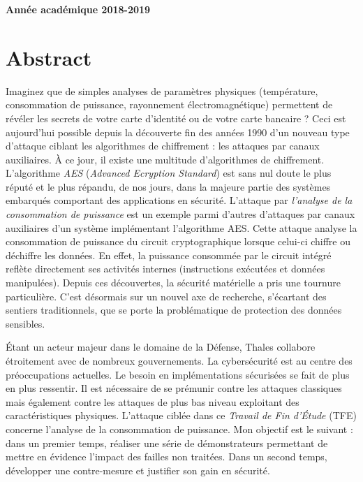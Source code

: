 \documentclass[oneside]{book}
\begin{document}
\vfill 
\centerline{\textbf{Année académique 2018-2019}}

\newpage
\strut
\thispagestyle{empty}
\newpage
\fancyfoot[C]{\thepage}

{} %
\null\vfil
\section*{\centering Abstract}

Imaginez que de simples analyses de paramètres physiques (température, consommation de puissance, rayonnement électromagnétique) permettent de révéler les secrets de votre carte d'identité ou de votre carte bancaire ?  
Ceci est aujourd'hui possible depuis la découverte fin des années 1990 d'un nouveau type d'attaque ciblant les algorithmes de chiffrement : les attaques par canaux auxiliaires. À ce jour, il existe une multitude d’algorithmes de chiffrement. L’algorithme \textit{AES} (\textit{Advanced Ecryption Standard}) est sans nul doute le plus réputé et le plus répandu, de nos jours, dans la majeure partie des systèmes embarqués comportant des applications en sécurité. L'attaque par \textit{l'analyse de la consommation de puissance} est un exemple parmi d'autres d'attaques par canaux auxiliaires d'un système implémentant l'algorithme AES. Cette attaque analyse la consommation de puissance du circuit cryptographique lorsque celui-ci chiffre ou déchiffre les données. En effet, la puissance consommée par le circuit intégré reflète directement ses activités internes (instructions exécutées et données manipulées). Depuis ces découvertes, la sécurité matérielle a pris une tournure particulière. C’est désormais sur un nouvel axe de recherche, s’écartant des sentiers traditionnels, que se porte la problématique de protection des données sensibles.

Étant un acteur majeur dans le domaine de la Défense, Thales collabore étroitement avec de nombreux gouvernements. La cybersécurité est au centre des préoccupations actuelles. Le besoin en implémentations sécurisées se fait de plus en plus ressentir. Il est nécessaire de se prémunir contre les attaques classiques mais également contre les attaques de plus bas niveau exploitant des caractéristiques physiques. L'attaque ciblée dans ce \textit{Travail de Fin d'Étude} (TFE) concerne l'analyse de la consommation de puissance. Mon objectif est le suivant : dans un premier temps, réaliser une série de démonstrateurs permettant de mettre en évidence l'impact des failles non traitées. Dans un second temps, développer une contre-mesure et justifier son gain en sécurité.
\end{document}
